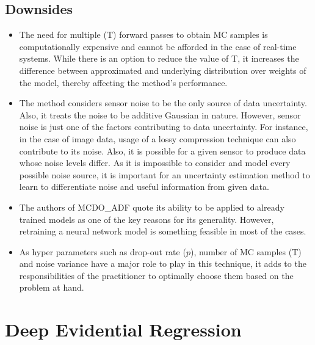	\subsection{Downsides}
	\begin{itemize}
		\item The need for multiple (T) forward passes to obtain MC samples is computationally expensive and cannot be afforded in the case of real-time systems. While there is an option to reduce the value of T, it increases the difference between approximated and underlying distribution over weights of the model, thereby affecting the method's performance. 
		\item The method considers sensor noise to be the only source of data uncertainty. Also, it treats the noise to be additive Gaussian in nature. However, sensor noise is just one of the factors contributing to data uncertainty. For instance, in the case of image data, usage of a lossy compression technique can also contribute to its noise. Also, it is possible for a given sensor to produce data whose noise levels differ. As it is impossible to consider and model every possible noise source, it is important for an uncertainty estimation method to learn to differentiate noise and useful information from given data.
		\item The authors of MCDO\_ADF quote its ability to be applied to already trained models as one of the key reasons for its generality. However, retraining a neural network model is something feasible in most of the cases.
		\item As hyper parameters such as drop-out rate ($p$), number of MC samples (T) and noise variance have a major role to play in this technique, it adds to the responsibilities of the practitioner to optimally choose them based on the problem at hand.
	\end{itemize}    
	
	\section{Deep Evidential Regression}\label{der}
	

